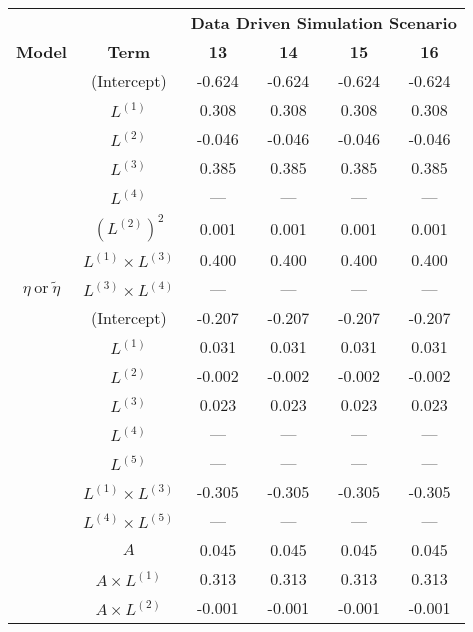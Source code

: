 \begin{table}
\begin{minipage}[t]{0.5\textwidth}
\centering

\begin{tabular}[t]{|>{}c|c|c|c|c|>{}c|}
\hline
\multicolumn{1}{|c|}{\textbf{ }} & \multicolumn{1}{|c|}{\textbf{ }} & \multicolumn{4}{|c|}{\textbf{Data Driven Simulation Scenario}} \\
\cline{3-6}
\textbf{Model} & \textbf{Term} & \textbf{13} & \textbf{14} & \textbf{15} & \textbf{16}\\
\hline
 & (Intercept) & -0.624 & -0.624 & -0.624 & -0.624\\
\cline{2-6}
 & $L^{(1)}$ & 0.308 & 0.308 & 0.308 & 0.308\\
\cline{2-6}
 & $L^{(2)}$ & -0.046 & -0.046 & -0.046 & -0.046\\
\cline{2-6}
 & $L^{(3)}$ & 0.385 & 0.385 & 0.385 & 0.385\\
\cline{2-6}
 & $L^{(4)}$ & --- & --- & --- & ---\\
\cline{2-6}
 & $(L^{(2)})^2$ & 0.001 & 0.001 & 0.001 & 0.001\\
\cline{2-6}
 & $L^{(1)} \times L^{(3)}$ & 0.400 & 0.400 & 0.400 & 0.400\\
\cline{2-6}
\multirow{-8}{*}{\centering\arraybackslash $\eta~\text{or}~\tilde\eta$} & $L^{(3)} \times L^{(4)}$ & --- & --- & --- & ---\\
\cline{1-6}
 & (Intercept) & -0.207 & -0.207 & -0.207 & -0.207\\
\cline{2-6}
 & $L^{(1)}$ & 0.031 & 0.031 & 0.031 & 0.031\\
\cline{2-6}
 & $L^{(2)}$ & -0.002 & -0.002 & -0.002 & -0.002\\
\cline{2-6}
 & $L^{(3)}$ & 0.023 & 0.023 & 0.023 & 0.023\\
\cline{2-6}
 & $L^{(4)}$ & --- & --- & --- & ---\\
\cline{2-6}
 & $L^{(5)}$ & --- & --- & --- & ---\\
\cline{2-6}
 & $L^{(1)} \times L^{(3)}$ & -0.305 & -0.305 & -0.305 & -0.305\\
\cline{2-6}
 & $L^{(4)} \times L^{(5)}$ & --- & --- & --- & ---\\
\cline{2-6}
 & $A$ & 0.045 & 0.045 & 0.045 & 0.045\\
\cline{2-6}
 & $A \times L^{(1)}$ & 0.313 & 0.313 & 0.313 & 0.313\\
\cline{2-6}
 & $A \times L^{(2)}$ & -0.001 & -0.001 & -0.001 & -0.001\\
\cline{2-6}

\end{tabular}
\end{minipage}
\end{table}
